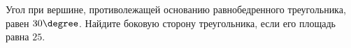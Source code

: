 \begin{ex}
	\begin{condition}
		Угол при вершине, противолежащей основанию равнобедренного треугольника, равен \(30\degree \). Найдите боковую сторону треугольника, если его площадь равна \(25\).
	\end{condition}
\end{ex}